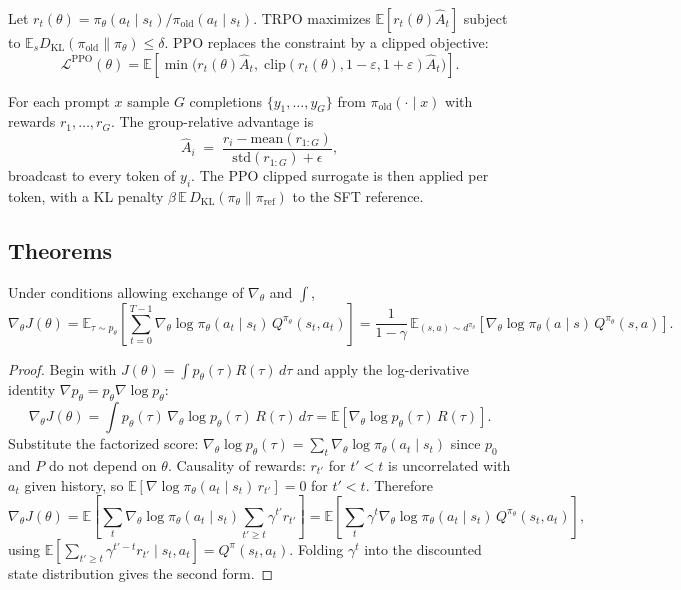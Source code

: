 \begin{definition}
Let $r_t(\theta)=\pi_\theta(a_t\mid s_t)/\pi_{\mathrm{old}}(a_t\mid s_t)$. TRPO maximizes $\mathbb{E}[r_t(\theta)\hat A_t]$ subject to $\mathbb{E}_s D_{\mathrm{KL}}(\pi_{\mathrm{old}}\|\pi_\theta)\leq\delta$. PPO replaces the constraint by a clipped objective:
\[
\mathcal{L}^{\mathrm{PPO}}(\theta)=\mathbb{E}\!\left[\min\!\bigl(r_t(\theta)\hat A_t,\;\mathrm{clip}(r_t(\theta),1-\varepsilon,1+\varepsilon)\hat A_t\bigr)\right].
\]
\end{definition}

\begin{definition}
For each prompt $x$ sample $G$ completions $\{y_1,\ldots,y_G\}$ from $\pi_{\mathrm{old}}(\cdot\mid x)$ with rewards $r_1,\ldots,r_G$. The group-relative advantage is
\[
\hat A_i \;=\; \frac{r_i-\mathrm{mean}(r_{1:G})}{\mathrm{std}(r_{1:G})+\epsilon},
\]
broadcast to every token of $y_i$. The PPO clipped surrogate is then applied per token, with a KL penalty $\beta\,\mathbb{E}\,D_{\mathrm{KL}}(\pi_\theta\|\pi_{\mathrm{ref}})$ to the SFT reference.
\end{definition}

\subsection*{Theorems}

\begin{theorem}
\label{thm:pg}
Under conditions allowing exchange of $\nabla_\theta$ and $\int$,
\[
\nabla_\theta J(\theta)
=\mathbb{E}_{\tau\sim p_\theta}\!\left[\sum_{t=0}^{T-1}\nabla_\theta\log\pi_\theta(a_t\mid s_t)\,Q^{\pi_\theta}(s_t,a_t)\right]
=\frac{1}{1-\gamma}\,\mathbb{E}_{(s,a)\sim d^{\pi_\theta}}\!\left[\nabla_\theta\log\pi_\theta(a\mid s)\,Q^{\pi_\theta}(s,a)\right].
\]
\end{theorem}

\begin{proof}
Begin with $J(\theta)=\int p_\theta(\tau)R(\tau)\,d\tau$ and apply the log-derivative identity $\nabla p_\theta=p_\theta\nabla\log p_\theta$:
\[
\nabla_\theta J(\theta)=\int p_\theta(\tau)\,\nabla_\theta\log p_\theta(\tau)\,R(\tau)\,d\tau=\mathbb{E}[\nabla_\theta\log p_\theta(\tau)\,R(\tau)].
\]
Substitute the factorized score: $\nabla_\theta\log p_\theta(\tau)=\sum_t\nabla_\theta\log\pi_\theta(a_t\mid s_t)$ since $p_0$ and $P$ do not depend on $\theta$. Causality of rewards: $r_{t'}$ for $t'<t$ is uncorrelated with $a_t$ given history, so $\mathbb{E}[\nabla\log\pi_\theta(a_t\mid s_t)\,r_{t'}]=0$ for $t'<t$. Therefore
\[
\nabla_\theta J(\theta)=\mathbb{E}\!\left[\sum_t\nabla_\theta\log\pi_\theta(a_t\mid s_t)\sum_{t'\geq t}\gamma^{t'}r_{t'}\right]
=\mathbb{E}\!\left[\sum_t\gamma^t\nabla_\theta\log\pi_\theta(a_t\mid s_t)\,Q^{\pi_\theta}(s_t,a_t)\right],
\]
using $\mathbb{E}[\sum_{t'\geq t}\gamma^{t'-t}r_{t'}\mid s_t,a_t]=Q^\pi(s_t,a_t)$. Folding $\gamma^t$ into the discounted state distribution gives the second form.
\end{proof}

